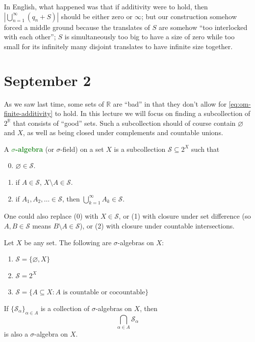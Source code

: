 \documentclass[11pt]{scrartcl}
\providecommand{\RR}{\mathbb R}
\providecommand{\ii}{\item}
\providecommand{\vocab}[1]{{\textbf{\textcolor{ForestGreen}{#1}}}}
\providecommand{\abs}[1]{\left\lvert #1\right\rvert}
\begin{document}
In English, what happened was that if additivity were to hold, then
$\abs{\bigcup_{n=1}^\infty (q_n+S)}$ should be either zero or $\infty$;
but our construction somehow forced a middle ground because
the translates of $S$ are somehow ``too interlocked with each other'';
$S$ is simultaneously too big to have a size of zero
while too small for its infinitely many disjoint translates
to have infinite size together.

\section{September 2}\label{sec:sep2}
As we saw last time, some sets of $\RR$ are ``bad'' in that
they don't allow for \autoref{eq:om-finite-additivity} to hold.
In this lecture we will focus on finding a subcollection of $2^\RR$
that consists of ``good'' sets. Such a subcollection should
of course contain $\varnothing$ and $X$, as well as
being closed under complements and countable unions.

\begin{definition}
    \label{def:sigma-algebra}
    A \vocab{$\sigma$-algebra} (or $\sigma$-field) on a set $X$
    is a subcollection $\mathcal S\subseteq 2^X$ such that
    \begin{enumerate}[(1)]
	\setcounter{enumi}{-1}
        \ii $\varnothing \in\mathcal S$.
	\ii if $A\in\mathcal S$, $X\setminus A\in\mathcal S$.
	\ii if $A_1,A_2,\ldots\in\mathcal S$, then
	$\bigcup_{k=1}^\infty A_k\in\mathcal S$.
    \end{enumerate}
    One could also replace (0) with $X\in\mathcal S$,
    or (1) with closure under set difference
    (so $A,B\in\mathcal S$ means $B\setminus A\in\mathcal S$),
    or (2) with closure under countable intersections.
\end{definition}

\begin{example}
    Let $X$ be any set. The following are $\sigma$-algebras on $X$:
    \begin{enumerate}[(1)]
	\ii $\mathcal S = \{\varnothing, X\}$
	\ii $\mathcal S = 2^X$
	\ii $\mathcal S = \{ A\subseteq X : A\text{ is countable or cocountable}\}$
    \end{enumerate}
\end{example}

\begin{lemma}
    \label{lem:intersect-sigma-algebras}
    If $\{\mathcal S_\alpha\}_{\alpha\in A}$ is a collection
    of $\sigma$-algebras on $X$, then
    \begin{equation*}
	\bigcap_{\alpha\in A}\mathcal S_\alpha
    \end{equation*}
    is also a $\sigma$-algebra on $X$.
\end{lemma}
\end{document}
